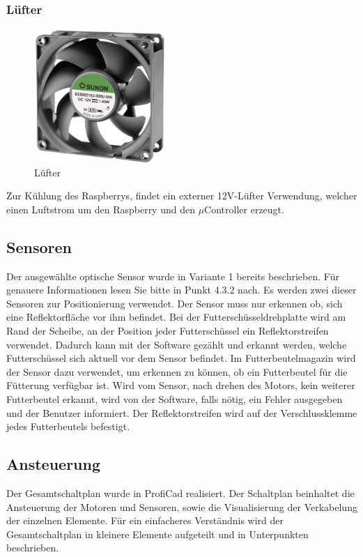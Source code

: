 \subsubsection{Lüfter}
\begin{figure}[H] 
\begin{center}

\includegraphics[width=5cm]{Bilder/Bauteile/Luefter}
\caption{Lüfter}
\label{Luefter}

\end{center}
\end{figure}
Zur Kühlung des Raspberrys, findet ein externer 12V-Lüfter Verwendung, welcher einen Luftstrom um den Raspberry und den $\mu$Controller erzeugt.
\subsection{Sensoren}
Der ausgewählte optische Sensor wurde in Variante 1 bereits beschrieben. Für genauere Informationen lesen Sie bitte in Punkt 4.3.2 nach.
Es werden zwei dieser Sensoren zur Positionierung verwendet. Der Sensor muss nur erkennen ob, sich eine Reflektorfläche vor ihm befindet. Bei der Futterschüsseldrehplatte wird am Rand der Scheibe, an der Position jeder Futterschüssel ein Reflektorstreifen verwendet. Dadurch kann mit der Software gezählt und erkannt werden, welche Futterschüssel sich aktuell vor dem Sensor befindet. Im Futterbeutelmagazin wird der Sensor dazu verwendet, um erkennen zu können, ob ein Futterbeutel für die Fütterung verfügbar ist. Wird vom Sensor, nach drehen des Motors, kein weiterer Futterbeutel erkannt, wird von der Software, falls nötig, ein Fehler ausgegeben und der Benutzer informiert. Der Reflektorstreifen wird auf der Verschlussklemme jedes Futterbeutels befestigt.
\subsection{Ansteuerung}
Der Gesamtschaltplan wurde in ProfiCad realisiert. Der Schaltplan beinhaltet die Ansteuerung der Motoren und Sensoren, sowie die Visualisierung der Verkabelung der einzelnen Elemente.
Für ein einfacheres Verständnis wird der Gesamtschaltplan in kleinere Elemente aufgeteilt und in Unterpunkten beschrieben.
\newpage
